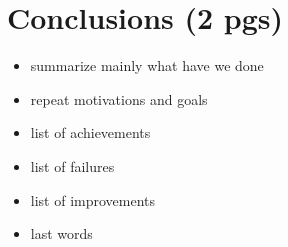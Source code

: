 \chapter{Conclusions (2 pgs)}

\begin{itemize}
	\item summarize mainly what have we done
	\item repeat motivations and goals
	\item list of achievements
	\item list of failures
	\item list of improvements
	\item last words
\end{itemize}


\newpage
